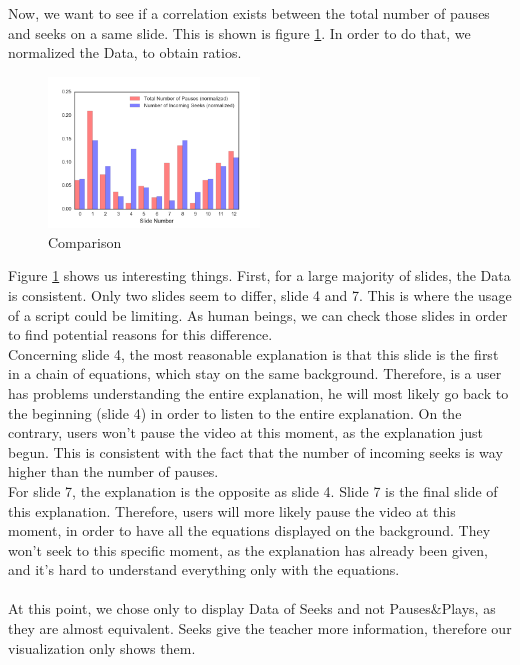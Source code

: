 \documentclass[11pt,a4paper]{article}
\begin{document}
Now, we want to see if a correlation exists between the total number of pauses and seeks on a same slide. This is shown is figure \ref{comparison}. In order to do that, we normalized the Data, to obtain ratios.
\begin{figure} %
\centering
\includegraphics[width=0.5\textwidth]{pictures/comparison.png}
\caption{Comparison}
\label{comparison}
\end{figure} 
Figure \ref{comparison} shows us interesting things. First, for a large majority of slides, the Data is consistent. Only two slides seem to differ, slide 4 and 7. This is where the usage of a script could be limiting. As human beings, we can check those slides in order to find potential reasons for this difference. \\
Concerning slide 4, the most reasonable explanation is that this slide is the first in a chain of equations, which stay on the same background. Therefore, is a user has problems understanding the entire explanation, he will most likely go back to the beginning (slide 4) in order to listen to the entire explanation. On the contrary, users won't pause the video at this moment, as the explanation just begun. This is consistent with the fact that the number of incoming seeks is way higher than the number of pauses. \\
For slide 7, the explanation is the opposite as slide 4. Slide 7 is the final slide of this explanation. Therefore, users will more likely pause the video at this moment, in order to have all the equations displayed on the background. They won't seek to this specific moment, as the explanation has already been given, and it's hard to understand everything only with the equations. \\
\\
At this point, we chose only to display Data of Seeks and not Pauses\&Plays, as they are almost equivalent. Seeks give the teacher more information, therefore our visualization only shows them.
\end{document}
